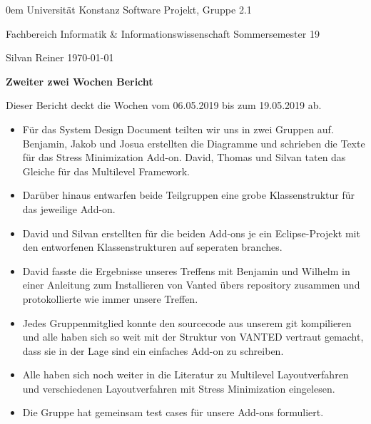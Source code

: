 \documentclass[]{article}
\date{}
\begin{document}
{\footnotesize \parindent0em
    {\sc Universität Konstanz} \hfill {\sc Software Projekt, Gruppe 2.1}\par
    {\sc Fachbereich Informatik \& Informationswissenschaft} \hfill Sommersemester 19 \par
    Silvan Reiner \hfill \today\par
    \bigskip
    \begin{center}
    {\LARGE\bf Zweiter zwei Wochen Bericht}
    \bigskip
    \end{center}
}

Dieser Bericht deckt die Wochen vom 06.05.2019 bis zum 19.05.2019 ab. \\

\begin{itemize}
	\item  Für das System Design Document teilten wir uns in zwei Gruppen auf. Benjamin, Jakob und Josua erstellten die Diagramme und schrieben die Texte für das Stress Minimization Add-on. David, Thomas und Silvan taten das Gleiche für das Multilevel Framework.
	\item Darüber hinaus entwarfen beide Teilgruppen eine grobe Klassenstruktur für das jeweilige Add-on.
	\item David und Silvan erstellten für die beiden Add-ons je ein Eclipse-Projekt mit den entworfenen Klassenstrukturen auf seperaten branches.
	\item David fasste die Ergebnisse unseres Treffens mit Benjamin und Wilhelm in einer Anleitung zum Installieren von Vanted übers repository zusammen und protokollierte wie immer unsere Treffen.
	\item Jedes Gruppenmitglied konnte den sourcecode aus unserem git kompilieren und alle haben sich so weit mit der Struktur von VANTED vertraut gemacht, dass sie in der Lage sind ein einfaches Add-on zu schreiben.
	\item Alle haben sich noch weiter in die Literatur zu Multilevel Layoutverfahren und verschiedenen Layoutverfahren mit Stress Minimization eingelesen.
	\item Die Gruppe hat gemeinsam test cases für unsere Add-ons formuliert.
\end{itemize} 
\end{document}
